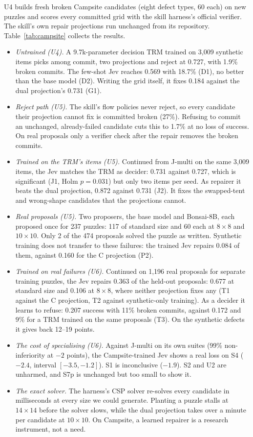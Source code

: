 \documentclass[11pt]{article}
\begin{document}
U4 builds fresh broken Campsite candidates (eight defect types, 60 each) on new puzzles and scores
every committed grid with the skill harness's official verifier. The skill's own repair
projections run unchanged from its repository. Table~\ref{tab:campsite} collects the results.
\begin{itemize}
  \item \emph{Untrained (U4).} A 9.7k-parameter decision TRM trained on 3,009 synthetic items picks
  among commit, two projections and reject at 0.727, with 1.9\% broken commits. The few-shot Jev
  reaches 0.569 with 18.7\% (D1), no better than the base model (D2). Writing the grid itself, it
  fixes 0.184 against the dual projection's 0.731 (G1).
  \item \emph{Reject path (U5).} The skill's flow policies never reject, so every candidate their
  projection cannot fix is committed broken (27\%). Refusing to commit an unchanged, already-failed
  candidate cuts this to 1.7\% at no loss of success. On real proposals only a verifier check after
  the repair removes the broken commits.
  \item \emph{Trained on the TRM's items (U5).} Continued from J-multi on the same 3,009 items,
  the Jev matches the TRM as decider: 0.731 against 0.727, which is significant (J1, Holm
  $p=0.031$) but only two items per seed. As repairer it beats the dual projection, 0.872 against
  0.731 (J2). It fixes the swapped-tent and wrong-shape candidates that the projections cannot.
  \item \emph{Real proposals (U5).} Two proposers, the base model and Bonsai-8B, each proposed
  once for 237 puzzles: 117 of standard size and 60 each at $8\times8$ and $10\times10$. Only 2 of
  the 474 proposals solved the puzzle as written. Synthetic training does not transfer to these failures: the trained Jev repairs 0.084
  of them, against 0.160 for the C projection (P2).
  \item \emph{Trained on real failures (U6).} Continued on 1,196 real proposals for separate
  training puzzles, the Jev repairs 0.363 of the held-out proposals: 0.677 at standard size and
  0.106 at $8\times8$, where neither projection fixes any (T1 against the C projection, T2 against
  synthetic-only training). As a decider it learns to refuse: 0.207 success with 11\% broken
  commits, against 0.172 and 9\% for a TRM trained on the same proposals (T3). On the synthetic
  defects it gives back 12--19 points.
  \item \emph{The cost of specialising (U6).} Against J-multi on its own suites (99\%
  non-inferiority at $-2$ points), the Campsite-trained Jev shows a real loss on S4 ($-2.4$,
  interval $[-3.5,-1.2]$). S1 is inconclusive ($-1.9$). S2 and U2 are unharmed, and S7p is
  unchanged but too small to show it.
  \item \emph{The exact solver.} The harness's CSP solver re-solves every candidate in
  milliseconds at every size we could generate. Planting a puzzle stalls at $14\times14$ before the
  solver slows, while the dual projection takes over a minute per candidate at $10\times10$. On Campsite, a learned
  repairer is a research instrument, not a need.
\end{itemize}
\end{document}
